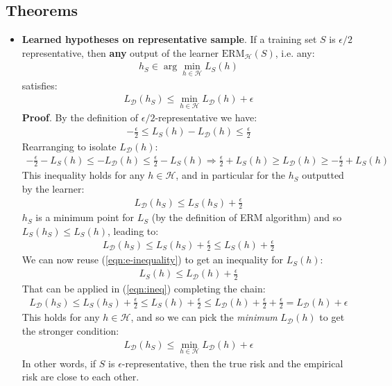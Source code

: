 \documentclass[../template.tex]{subfiles}
\begin{document}
\subsection{Theorems}
\begin{itemize}
    \item \textbf{Learned hypotheses on representative sample}. If a training set $S$ is $\epsilon/2$ representative, then \textbf{any} output of the learner $\mathrm{ERM}_{\mathcal{H}}(S)$, i.e. any:
    \begin{align*}
        h_S \in \arg\min_{h \in \mathcal{H}}L_S(h)
    \end{align*}
    satisfies:
    \begin{align*}
        L_{\mathcal{D}}(h_S) \leq \min_{h \in \mathcal{H}} L_{\mathcal{D}}(h) + \epsilon
    \end{align*}
    \textbf{Proof}. By the definition of $\epsilon/2$-representative we have:
    \begin{align} \label{eqn:e-inequality}
        -\frac{\epsilon}{2} \leq L_{S}(h) - L_{\mathcal{D}}(h) \leq \frac{\epsilon}{2} 
    \end{align}
    Rearranging to isolate $L_{\mathcal{D}}(h)$:
    \begin{align*}
        -\frac{\epsilon}{2} - L_S(h) \leq -L_{\mathcal{D}}(h) \leq \frac{\epsilon}{2} - L_{S}(h) \Rightarrow \frac{\epsilon}{2} + L_S(h) \geq L_{\mathcal{D}}(h) \geq -\frac{\epsilon}{2} + L_S(h)     
    \end{align*}
    This inequality holds for any $h\in \mathcal{H}$, and in particular for the $h_S$ outputted by the learner:
    \begin{align*}
        L_{\mathcal{D}}(h_S) \leq L_S(h_S) + \frac{\epsilon}{2} 
    \end{align*}
    $h_S$ is a minimum point for $L_S$ (by the definition of ERM algorithm) and so $L_S(h_S) \leq L_S(h)$, leading to:
    \begin{align} \label{eqn:ineq}
        L_{\mathcal{D}}(h_S) \leq L_S(h_S) + \frac{\epsilon}{2} \leq L_S(h) + \frac{\epsilon}{2} 
    \end{align}
    We can now reuse (\ref{eqn:e-inequality}) to get an inequality for $L_S(h)$:
    \begin{align*}
        L_S(h) \leq L_{\mathcal{D}}(h) + \frac{\epsilon}{2} 
    \end{align*}
    That can be applied in (\ref{eqn:ineq}) completing the chain:
    \begin{align*}
        L_{\mathcal{D}}(h_S) \leq L_S(h_S) + \frac{\epsilon}{2} \leq L_S(h) + \frac{\epsilon}{2} \leq L_{\mathcal{D}}(h) + \frac{\epsilon}{2} + \frac{\epsilon}{2} = L_{\mathcal{D}}(h) + \epsilon  
    \end{align*}
    This holds for any $h \in \mathcal{H}$, and so we can pick the \textit{minimum} $L_{\mathcal{D}}(h)$ to get the stronger condition:
    \begin{align*}
        L_{\mathcal{D}}(h_S) \leq \min_{h \in \mathcal{H}} L_{\mathcal{D}}(h) + \epsilon
    \end{align*}  
    In other words, if $S$ is $\epsilon$-representative, then the true risk and the empirical risk are close to each other.


\end{itemize}
\end{document}
